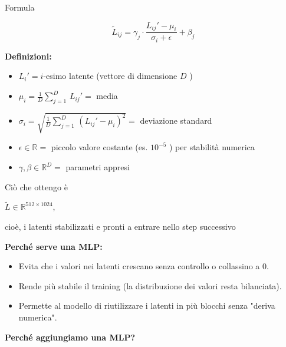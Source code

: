 \documentclass[
  11pt,
]{article}
\begin{document}
Formula

\[{\widetilde{L}}_{ij} = \gamma_{j} \cdot \frac{L_{ij}' - \mu_{i}}{\sigma_{i} + \epsilon} + \beta_{j}\]

\textbf{Definizioni:}

\begin{itemize}
\item
  \(L_{i}' = i\)-esimo latente (vettore di dimensione \(D\) )
\item
  \(\mu_{i} = \frac{1}{D}\sum_{j = 1}^{D}\, L_{ij}' =\) media
\item
  \(\sigma_{i} = \sqrt{\frac{1}{D}\sum_{j = 1}^{D}\,\left( L_{ij}' - \mu_{i} \right)^{2}} =\)
  deviazione standard
\item
  \(\epsilon \in \mathbb{R} =\) piccolo valore costante (es.
  \(10^{- 5}\) ) per stabilità numerica
\item
  \(\gamma,\beta \in \mathbb{R}^{D} =\) parametri appresi
\end{itemize}

Ciò che ottengo è


\(\widetilde{L} \in \mathbb{R}^{512 \times 1024}\),


cioè, i latenti stabilizzati e pronti a entrare nello step successivo

\textbf{Perché serve una MLP:}

\begin{itemize}
\item
  Evita che i valori nei latenti crescano senza controllo o collassino a
  0.
\item
  Rende più stabile il training (la distribuzione dei valori resta
  bilanciata).
\item
  Permette al modello di riutilizzare i latenti in più blocchi senza
  "deriva numerica".
\end{itemize}

\textbf{Perché aggiungiamo una MLP?}
\end{document}
